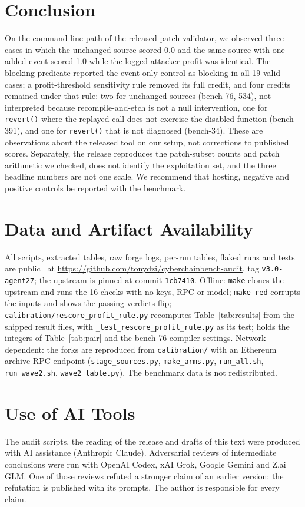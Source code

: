 \documentclass[conference]{IEEEtran}
\newcommand{\code}[1]{\texttt{#1}}
\begin{document}
\section{Conclusion}
On the command-line path of the released patch validator, we observed three cases in which the unchanged source scored 0.0 and the same source with one added event scored 1.0 while the logged attacker profit was identical. The blocking predicate reported the event-only control as blocking in all 19 valid cases; a profit-threshold sensitivity rule removed its full credit, and four credits remained under that rule: two for unchanged sources (bench-76, 534), not interpreted because recompile-and-etch is not a null intervention, one for \code{revert()} where the replayed call does not exercise the disabled function (bench-391), and one for \code{revert()} that is not diagnosed (bench-34). These are observations about the released tool on our setup, not corrections to published scores. Separately, the release reproduces the patch-subset counts and patch arithmetic we checked, does not identify the exploitation set, and the three headline numbers are not one scale. We recommend that hosting, negative and positive controls be reported with the benchmark.

\section*{Data and Artifact Availability}
All scripts, extracted tables, raw forge logs, per-run tables, flaked runs and tests are public~\cite{audit} at \url{https://github.com/tonydzi/cyberchainbench-audit}, tag \code{v3.0-agent27}; the upstream is pinned at commit \code{1cb7410}. Offline: \code{make} clones the upstream and runs the 16 checks with no keys, RPC or model; \code{make red} corrupts the inputs and shows the passing verdicts flip; \code{calibration/rescore\_profit\_rule.py} recomputes Table~\ref{tab:results} from the shipped result files, with \code{\_test\_rescore\_profit\_rule.py} as its test;  holds the integers of Table~\ref{tab:pair} and  the bench-76 compiler settings. Network-dependent: the forks are reproduced from \code{calibration/} with an Ethereum archive RPC endpoint (\code{stage\_sources.py}, \code{make\_arms.py}, \code{run\_all.sh}, \code{run\_wave2.sh}, \code{wave2\_table.py}). The benchmark data is not redistributed.

\section*{Use of AI Tools}
The audit scripts, the reading of the release and drafts of this text were produced with AI assistance (Anthropic Claude). Adversarial reviews of intermediate conclusions were run with OpenAI Codex, xAI Grok, Google Gemini and Z.ai GLM. One of those reviews refuted a stronger claim of an earlier version; the refutation is published with its prompts. The author is responsible for every claim.
\end{document}
